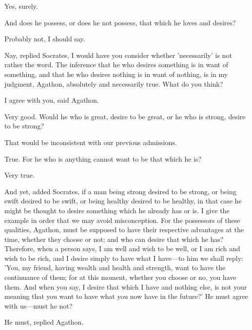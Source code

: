 \documentclass[11pt,letter]{article}
\begin{document}
\par  Yes, surely.

\par  And does he possess, or does he not possess, that which he loves and desires?

\par  Probably not, I should say.

\par  Nay, replied Socrates, I would have you consider whether 'necessarily' is not rather the word. The inference that he who desires something is in want of something, and that he who desires nothing is in want of nothing, is in my judgment, Agathon, absolutely and necessarily true. What do you think?

\par  I agree with you, said Agathon.

\par  Very good. Would he who is great, desire to be great, or he who is strong, desire to be strong?

\par  That would be inconsistent with our previous admissions.

\par  True. For he who is anything cannot want to be that which he is?

\par  Very true.

\par  And yet, added Socrates, if a man being strong desired to be strong, or being swift desired to be swift, or being healthy desired to be healthy, in that case he might be thought to desire something which he already has or is. I give the example in order that we may avoid misconception. For the possessors of these qualities, Agathon, must be supposed to have their respective advantages at the time, whether they choose or not; and who can desire that which he has? Therefore, when a person says, I am well and wish to be well, or I am rich and wish to be rich, and I desire simply to have what I have—to him we shall reply: 'You, my friend, having wealth and health and strength, want to have the continuance of them; for at this moment, whether you choose or no, you have them. And when you say, I desire that which I have and nothing else, is not your meaning that you want to have what you now have in the future?' He must agree with us—must he not?

\par  He must, replied Agathon.
\end{document}
